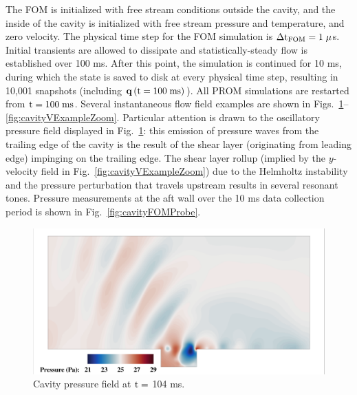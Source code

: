 The FOM is initialized with free stream conditions outside the cavity, and the inside of the cavity is initialized with free stream pressure and temperature, and zero velocity. The physical time step for the FOM simulation is $\Delta \text{t}_{\text{FOM}} = 1 \;\mu$s. Initial transients are allowed to dissipate and statistically-steady flow is established over 100 ms. After this point, the simulation is continued for 10 ms, during which the state is saved to disk at every physical time step, resulting in 10,001 snapshots (including $\mathbf{q}\left(\text{t} = 100 \; \text{ms}\right)$). All PROM simulations are restarted from $\text{t} = 100 \; \text{ms}$. Several instantaneous flow field examples are shown in Figs.~\ref{fig:cavityPressExample}--\ref{fig:cavityVExampleZoom}. Particular attention is drawn to the oscillatory pressure field displayed in Fig.~\ref{fig:cavityPressExample}: this emission of pressure waves from the trailing edge of the cavity is the result of the shear layer (originating from leading edge) impinging on the trailing edge. The shear layer rollup (implied by the $y$-velocity field in Fig.~\ref{fig:cavityVExampleZoom}) due to the Helmholtz instability and the pressure perturbation that travels upstream results in several resonant tones. Pressure measurements at the aft wall over the 10 ms data collection period is shown in Fig.~\ref{fig:cavityFOMProbe}.

\begin{figure}
	\centering
	\includegraphics[width=0.9\linewidth,trim={0.5em 0.5em 0.5em 0.5em},clip]{Chapters/HPROMResults/Images/cavity/pressure_example_full.png}
	\caption{\label{fig:cavityPressExample}Cavity pressure field at $\text{t} =$ 104 ms.}
\end{figure}

